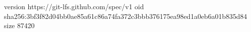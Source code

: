 version https://git-lfs.github.com/spec/v1
oid sha256:3bf3f82d04bb0ae85a61c86a74fa372c3bbb376175ea98ed1a0eb6a01b835d84
size 87420
